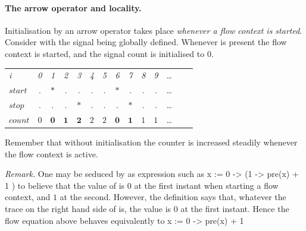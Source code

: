 \paragraph{The arrow operator and locality.}

Initialisation by an arrow operator takes place \emph{whenever a flow context is started}. Consider
%
 with the signal  being globally defined.
Whenever  is present the flow context is started, and the signal count is initialised to $0$.
\begin{center}
  \leavevmode
  \begin{tabular}[]{l@{\quad}||@{\quad}ccccccccccccc}
    \hline\hline
     \hbox{{\footnotesize \textit{i}}} &{\footnotesize \textit{0}}
     &{\footnotesize \textit{1}}&{\footnotesize \textit{2}}
     &{\footnotesize \textit{3}}&{\footnotesize \textit{4}}
     &{\footnotesize \textit{5}}&{\footnotesize \textit{6}}
     &{\footnotesize \textit{7}}&{\footnotesize \textit{8}}
     &{\footnotesize \textit{9}}&\ldots
   \\      
    \hbox{$start$} &.&$*$&.&.&.&.&$*$&.&.&.&\ldots
   \\
    \hbox{$stop$} &.&.&.&$*$&.&.&.&$*$&.&.&\ldots
   \\          
   \hbox{$count$} &$\mathit{0}$&$\mathbf{0}$&$\mathbf{1}$&$\mathbf{2}$
   &$\mathit{2}$&$\mathit{2}$&$\mathbf{0}$&$\mathbf{1}$&
   $\mathit{1}$&$\mathit{1}$&\ldots
   \\     \hline\hline
  \end{tabular}
\end{center}
Remember that without initialisation the counter is increased steadily 
whenever the flow context is active.

\noindent\emph{Remark.} One may be seduced by as expression such as
%
\BEP
  x := 0 -> (1 -> pre(x) + 1 )
\EEP
%
to believe that the value of  is $0$ at the first instant when starting a flow context, and $1$ at the second. However, the definition says that,
whatever the trace on the right hand side of  is, the value
is $0$ at the first instant. Hence the flow equation above behaves equivalently to
%
\BEP
  x := 0 -> pre(x) + 1
\EEP
%

